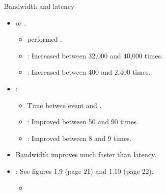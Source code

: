 \begin{frame}[t]{Bandwidth and latency}
  \begin{itemize}
    \item {} or .
      \begin{itemize}
        \item {} performed .
        \item {}: Increased between 32,000 and 40,000 times.
        \item {}: Increased between 400 and 2,400 times.
      \end{itemize}

    \item {}:
      \begin{itemize}
        \item Time betwee event  and .
        \item {}: Improved between 50 and 90 times.
        \item {}: Improved between 8 and 9 times.
      \end{itemize}

    \item Bandwidth improves much faster than latency.

    \item {}: See figures 1.9 (page 21) and 1.10 (page 22).
      \begin{itemize}
        \item \bibhennessy
      \end{itemize}
  \end{itemize}
\end{frame}
